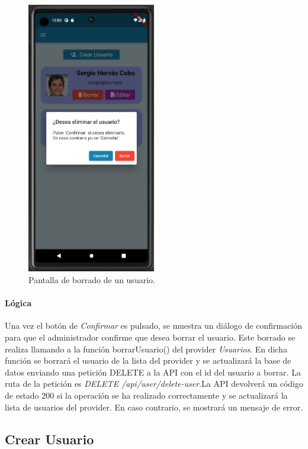 \begin{figure}[H]
  \centering
  \includegraphics[width=0.5\textwidth]{imagenes/c7/borrarusuario.png}
  \caption{Pantalla de borrado de un usuario.} 
  \label{fig:borradousuario}
\end{figure}

\paragraph*{Lógica}
Una vez el botón de \textit{Confirmar} es pulsado, se muestra un diálogo de confirmación para que el administrador confirme que desea borrar el usuario.
Este borrado se realiza llamando a la función borrarUsuario() del provider \textit{Usuarios}. En dicha función se borrará el usuario de la lista del provider y se actualizará la base de datos enviando
una petición DELETE a la API con el id del usuario a borrar. La ruta de la petición es \textit{DELETE /api/user/delete-user}.La API devolverá un código de estado 200 si la operación se ha realizado correctamente y se actualizará la lista de usuarios del provider. En caso contrario, se mostrará un mensaje de error.

\subsection{Crear Usuario} 


